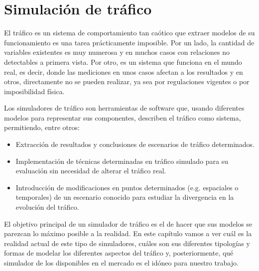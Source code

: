 \chapter{Simulación de tráfico}
\label{ch:sota-traffic-simulation}


El tráfico es un sistema de comportamiento tan caótico que extraer modelos de su funcionamiento es una tarea prácticamente imposible. Por un lado, la cantidad de variables existentes es muy numerosa y en muchos casos con relaciones no detectables a primera vista. Por otro, es un sistema que funciona en el mundo real, es decir, donde las mediciones en unos casos afectan a los resultados y en otros, directamente no se pueden realizar, ya sea por regulaciones vigentes o por imposibilidad física.

Los simuladores de tráfico son herramientas de software que, usando diferentes modelos para representar sus componentes, describen el tráfico como sistema, permitiendo, entre otros:

\begin{itemize}
	\item Extracción de resultados y conclusiones de escenarios de tráfico determinados.
	\item Implementación de técnicas determinadas en tráfico simulado para su evaluación sin necesidad de alterar el tráfico real.
	\item Introducción de modificaciones en puntos determinados (e.g. espaciales o temporales) de un escenario conocido para estudiar la divergencia en la evolución del tráfico.
\end{itemize}

El objetivo principal de un simulador de tráfico es el de hacer que sus modelos se parezcan lo máximo posible a la realidad. En este capítulo vamos a ver cuál es la realidad actual de este tipo de simuladores, cuáles son sus diferentes tipologías y formas de modelar los diferentes aspectos del tráfico y, posteriormente, qué simulador de los disponibles en el mercado es el idóneo para nuestro trabajo.

